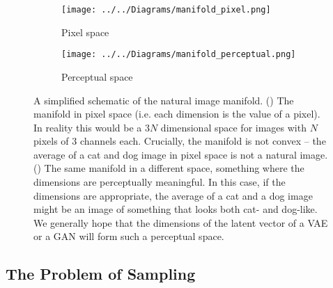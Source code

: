\documentclass[11pt, a4paper]{book}
\begin{document}
\begin{figure}
	\centering
	\vspace{-3cm}	
	
    \begin{subfigure}{0.7\columnwidth}
        \centering
        \caption{Pixel space}
        \texttt{[image: ../../Diagrams/manifold\_pixel.png]}
        \label{manifold:pixel}
    \end{subfigure}
    \vspace{1cm}
    
    \begin{subfigure}{0.7\columnwidth}
        \centering
        \caption{Perceptual space}
        \texttt{[image: ../../Diagrams/manifold\_perceptual.png]} 
        \label{manifold:perceptual}
    \end{subfigure}
  \caption[Simplified schematic of the natural image manifold]{A simplified schematic of the natural image manifold. () The manifold in pixel space (i.e. each dimension is the value of a pixel). In reality this would be a $3N$ dimensional space for images with $N$ pixels of 3 channels each. Crucially, the manifold is not convex -- the average of a cat and dog image in pixel space is not a natural image. () The same manifold in a different space, something where the dimensions are perceptually meaningful. In this case, if the dimensions are appropriate, the average of a cat and a dog image might be an image of something that looks both cat- and dog-like. We generally hope that the dimensions of the latent vector of a VAE or a GAN will form such a perceptual space.}
  \label{manifold}
\end{figure}


\subsection{The Problem of Sampling}
\end{document}
